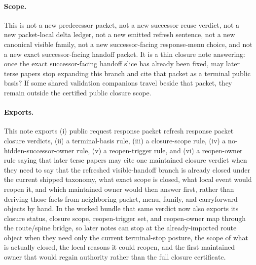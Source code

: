 \documentclass[11pt]{article}
\begin{document}
\paragraph{Scope.}
This is not a new predecessor packet, not a new successor reuse verdict, not a new packet-local delta ledger, not a new emitted refresh sentence, not a new canonical visible family, not a new successor-facing response-menu choice, and not a new exact successor-facing handoff packet.
It is a thin closure note answering: once the exact successor-facing handoff slice has already been fixed, may later terse papers stop expanding this branch and cite that packet as a terminal public basis? If some shared validation companions travel beside that packet, they remain outside the certified public closure scope.

\paragraph{Exports.}
This note exports (i) public request response packet refresh response packet closure verdicts, (ii) a terminal-basis rule, (iii) a closure-scope rule, (iv) a no-hidden-successor-owner rule, (v) a reopen-trigger rule, and (vi) a reopen-owner rule saying that later terse papers may cite one maintained closure verdict when they need to say that the refreshed visible-handoff branch is already closed under the current shipped taxonomy, what exact scope is closed, what local event would reopen it, and which maintained owner would then answer first, rather than deriving those facts from neighboring packet, menu, family, and carryforward objects by hand. In the worked bundle that same verdict now also exports its closure status, closure scope, reopen-trigger set, and reopen-owner map through the route/spine bridge, so later notes can stop at the already-imported route object when they need only the current terminal-stop posture, the scope of what is actually closed, the local reasons it could reopen, and the first maintained owner that would regain authority rather than the full closure certificate.
\end{document}
